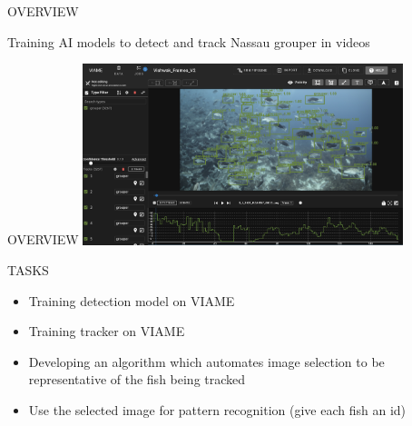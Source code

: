 
\begin{frame}{OVERVIEW}

   Training AI models to detect and track Nassau grouper in videos
\end{frame}


\begin{frame}{OVERVIEW}
    \centering
     \includegraphics[height=0.7\textheight,width=0.7\textwidth,keepaspectratio]{images/gm1.png}
     
\end{frame}

\begin{frame}{TASKS}
    \begin{itemize}
        \item Training detection model on VIAME
        \item Training tracker on VIAME 
        \item Developing an algorithm which automates image selection to be representative of the fish being tracked
        \item Use the selected image for pattern recognition (give each fish an id)
    \end{itemize}
\end{frame}




